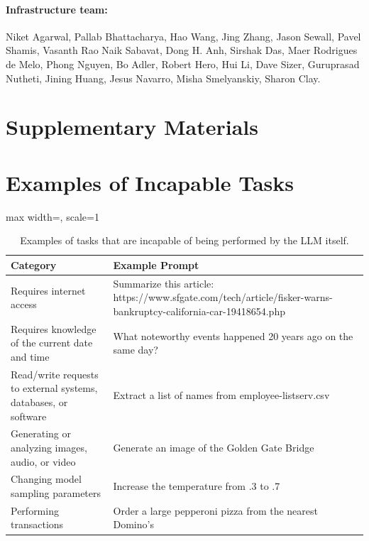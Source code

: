 \documentclass[11pt]{article}
\begin{document}
\paragraph{Infrastructure team:} 
Niket Agarwal, Pallab Bhattacharya, Hao Wang, Jing Zhang, Jason Sewall, Pavel Shamis, Vasanth Rao Naik Sabavat, Dong H. Anh, Sirshak Das, Maer Rodrigues de Melo, Phong Nguyen, Bo Adler, Robert Hero, Hui Li, Dave Sizer, Guruprasad Nutheti, Jining Huang, Jesus Navarro, Misha Smelyanskiy, Sharon Clay.





\FloatBarrier

\clearpage
\appendix

\section*{Supplementary Materials} \label{supplementary_material}

\section{Examples of Incapable Tasks}
\label{sec:sup-incapable-tasks}
\begin{table}[h!]
\centering
\fontsize{11}{14}\selectfont %
\begin{adjustbox}{max width=\textwidth, scale=1}
\begin{tabular}{p{5cm}p{10cm}}
\toprule
Category &  Example Prompt\\

\midrule
Requires internet access
 & Summarize this article: https://www.sfgate.com/tech/article/fisker-warns-bankruptcy-california-car-19418654.php\\
 \midrule
Requires knowledge of the current date and time & What noteworthy events happened 20 years ago on the same day?\\
\midrule
Read/write requests to external systems, databases, or software & Extract a list of names from employee-listserv.csv \\
\midrule
Generating or analyzing images, audio, or video & Generate an image of the Golden Gate Bridge \\
\midrule
Changing model sampling parameters & Increase the temperature from .3 to .7 \\
\midrule
Performing transactions & Order a large pepperoni pizza from the nearest Domino’s \\

\bottomrule
\end{tabular}
\end{adjustbox}
\caption{Examples of tasks that are incapable of being performed by the LLM itself. }
\label{tab:incapable-tasks}
\end{table}
\end{document}
